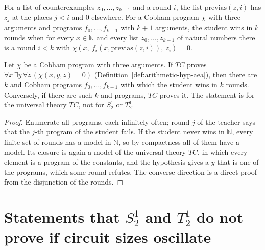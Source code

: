 \begin{definition}
  \label{def:arithmetic-student}
  \leanok
  \own{}
  \infrastructure{}
  For a list of counterexamples $z_0, \dots, z_{k-1}$ and a round $i$, the list $\mathrm{previas}(z,
  i)$ has $z_j$ at the places $j < i$ and $0$ elsewhere. For a Cobham program $\chi$ with three
  arguments and programs $f_0, \dots, f_{k-1}$ with $k + 1$ arguments, the student wins in $k$ rounds
  when for every $x \in \mathbb{N}$ and every list $z_0, \dots, z_{k-1}$ of natural numbers there is
  a round $i < k$ with $\chi(x,\ f_i(x, \mathrm{previas}(z, i)),\ z_i) = 0$.
\end{definition}

\begin{theorem}
  \label{thm:arithmetic-kpt}
  \leanok
  Let $\chi$ be a Cobham program with three arguments. If $TC$ proves $\forall x\, \exists y\,
  \forall z\, (\chi(x, y, z) = 0)$ (Definition~\ref{def:arithmetic-hyp-aea}), then there are $k$ and
  Cobham programs $f_0, \dots, f_{k-1}$ with which the student wins in $k$ rounds. Conversely, if
  there are such $k$ and programs, $TC$ proves it.
  The statement is for the universal theory $TC$, not for $S^1_2$ or $T^1_2$.
\end{theorem}

\begin{proof}
  \leanok
  Enumerate all programs, each infinitely often; round $j$ of the teacher says that the $j$-th
  program of the student fails. If the student never wins in $\mathbb{N}$, every finite set of rounds
  has a model in $\mathbb{N}$, so by compactness all of them have a model. Its closure is again a model
  of the universal theory $TC$, in which every element is a program of the constants, and the
  hypothesis gives a $y$ that is one of the programs, which some round refutes. The converse
  direction is a direct proof from the disjunction of the rounds.
\end{proof}

\section{Statements that $S^1_2$ and $T^1_2$ do not prove if circuit sizes oscillate}
\label{sec:arithmetic-oscillation}


